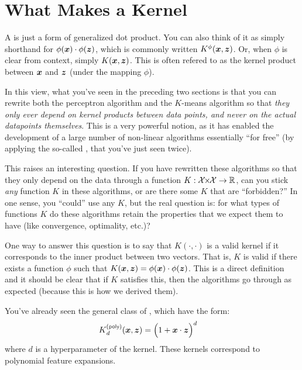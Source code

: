 \section{What Makes a Kernel}

A  is just a form of generalized dot product.  You can
also think of it as simply shorthand for
$\phi({\boldsymbol{x}}) \cdot \phi({\boldsymbol{z}})$, which is commonly written
$K^\phi({\boldsymbol{x}},{\boldsymbol{z}})$.  Or, when $\phi$ is clear from context, simply
$K({\boldsymbol{x}},{\boldsymbol{z}})$.  This is often refered to as the kernel product between
${\boldsymbol{x}}$ and ${\boldsymbol{z}}$ (under the mapping $\phi$).

In this view, what you've seen in the preceding two sections is that
you can rewrite both the perceptron algorithm and the $K$-means
algorithm so that \emph{they only ever depend on kernel products
  between data points, and never on the actual datapoints themselves}.
This is a very powerful notion, as it has enabled the development of a
large number of non-linear algorithms essentially ``for free'' (by
applying the so-called , that you've just seen
twice).

This raises an interesting question.  If you have rewritten these
algorithms so that they only depend on the data through a function $K
: \cX \times \cX \fto \R$, can you stick \emph{any} function $K$ in
these algorithms, or are there some $K$ that are ``forbidden?''  In
one sense, you ``could'' use any $K$, but the real question is: for
what types of functions $K$ do these algorithms retain the properties
that we expect them to have (like convergence, optimality, etc.)?

One way to answer this question is to say that $K(\cdot,\cdot)$ is a
valid kernel if it corresponds to the inner product between two
vectors.  That is, $K$ is valid if there exists a function $\phi$ such
that $K({\boldsymbol{x}},{\boldsymbol{z}}) = \phi({\boldsymbol{x}}) \cdot \phi({\boldsymbol{z}})$.  This is a direct
definition and it should be clear that if $K$ satisfies this, then the
algorithms go through as expected (because this is how we derived
them).

You've already seen the general class of ,
which have the form:
%
\begin{align}
K\xth{poly}_d(\vx,\vz) &= \Big( 1 + \dotp{\vx}{\vz} \Big)^d
\end{align}
%
where $d$ is a hyperparameter of the kernel.  These kernels correspond
to polynomial feature expansions.

